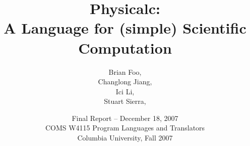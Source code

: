 \documentclass{report}
\begin{document}
\title{Physicalc:\\
A Language for (simple) Scientific Computation}

\date{Final Report -- December 18, 2007\\
COMS W4115 Program Languages and Translators \\
Columbia University, Fall 2007}

\author{Brian Foo, \\
Changlong Jiang, \\
Ici Li, \\
Stuart Sierra, }

\maketitle

\tableofcontents




















\end{document}
